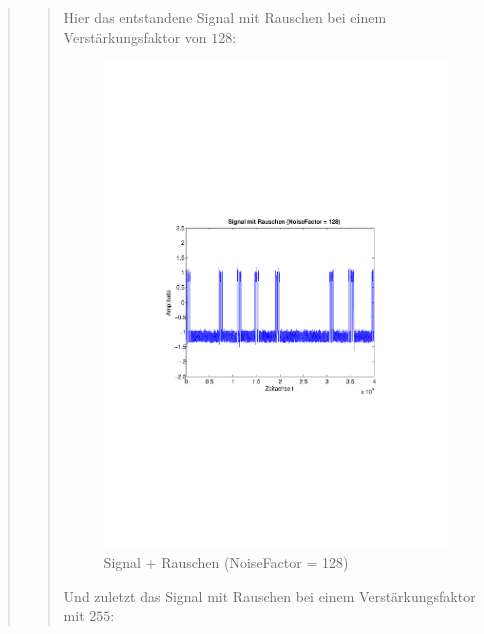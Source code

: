 \begin{quote}
\begin{quote}
        Hier das entstandene Signal mit Rauschen bei einem Verstärkungsfaktor
        von $128$:
        
         \begin{figure}[H]
        \centering
            \includegraphics[scale=0.65, trim = 1.5cm 9cm 1.5cm 9cm,
            clip]{./Bilder/aufgabe1/nf128}
                \caption{Signal + Rauschen (NoiseFactor = 128)}
        \end{figure}
        
        Und zuletzt das Signal mit Rauschen bei einem Verstärkungsfaktor mit
        $255$:
        

\end{quote}
\end{quote}
